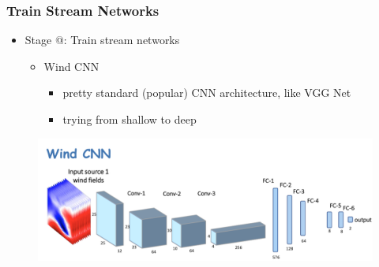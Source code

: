 \documentclass{beamer}
\makeatletter
\newcommand{\Rmnum}[1]{\expandafter\@slowromancap\romannumeral #1@}
\makeatother
\begin{document}
\begin{frame}
\frametitle{Train Stream Networks}
\begin{itemize}
	\item  Stage \Rmnum{1}: Train stream networks \\
	\begin{itemize}
		\item Wind CNN
		\begin{itemize}
			\item pretty standard (popular) CNN architecture, like VGG Net \cite{simonyan2014very}
			\item trying from shallow to deep
		\end{itemize}
	\end{itemize}
\end{itemize}
\begin{figure}
	\includegraphics[width=0.8\linewidth]{figs/wind-cnn.png}
\end{figure}
\end{frame}
\end{document}

